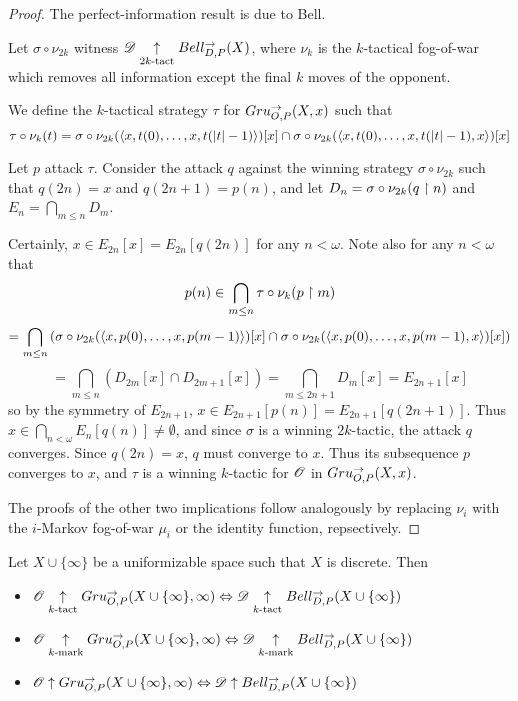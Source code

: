 \begin{proof}
The perfect-information result is due to Bell.

Let $\sigma\circ \nu_{2k}$ witness $\mathscr{D} \underset{2k\text{-tact}}{\uparrow} Bell_{D,P}^{\to}(X)$,
where $\nu_k$ is the $k$-tactical fog-of-war which removes all information
except the final $k$ moves of the opponent.

We define the $k$-tactical strategy $\tau$ for $Gru_{O,P}^{\to}(X,x)$ such that
  \[
    \tau\circ \nu_k(t)
      =
    \sigma\circ \nu_{2k}(\langle x,t(0),\dots,x,t(|t|-1)\rangle)[x]
      \cap
    \sigma\circ \nu_{2k}(\langle x,t(0),\dots,x,t(|t|-1),x\rangle)[x]
  \]

Let $p$ attack $\tau$. Consider the attack $q$ against the winning strategy
$\sigma\circ \nu_{2k}$ such that $q(2n)=x$ and $q(2n+1)=p(n)$, and let
$D_n=\sigma\circ \nu_{2k}(q\restriction n)$ and $E_n=\bigcap_{m\leq n}D_m$.

Certainly, $x\in E_{2n}[x]= E_{2n}[q(2n)]$ for any $n<\omega$.
Note also for any $n<\omega$ that
    \[
      p(n) \in
      \bigcap_{m\leq n}\tau\circ \nu_k(p\restriction m)
    \]
    \[
      =
      \bigcap_{m\leq n}\left(
        \sigma\circ \nu_{2k}(\langle x,p(0),\dots,x,p(m-1)\rangle)[x]\cap
        \sigma\circ \nu_{2k}(\langle x,p(0),\dots,x,p(m-1),x\rangle)[x]
      \right)
    \]
    \[
      =
      \bigcap_{m\leq n}\left(
        D_{2m}[x]\cap
        D_{2m+1}[x]
      \right) =
      \bigcap_{m\leq 2n+1} D_m[x]=E_{2n+1}[x]
    \]
so by the symmetry of $E_{2n+1}$, $x\in E_{2n+1}[p(n)]= E_{2n+1}[q(2n+1)]$.
Thus $x\in \bigcap_{n<\omega} E_n[q(n)]\not=\emptyset$, and since $\sigma$ is
a winning $2k$-tactic, the attack $q$ converges. Since $q(2n)=x$, $q$ must
converge to $x$. Thus its subsequence $p$ converges to $x$, and $\tau$ is a
winning $k$-tactic for $\mathscr{O}$ in $Gru_{O,P}^{\to}(X,x)$.

The proofs of the other two implications follow analogously by
replacing $\nu_i$ with the $i$-Markov fog-of-war $\mu_i$ or the identity
function, repsectively.
\end{proof}

\begin{thm}
  Let $X\cup\{\infty\}$ be a uniformizable space such that $X$ is discrete. Then
  \begin{itemize}
    \item
      $
        \mathscr{O}\underset{k\text{-tact}}{\uparrow} Gru_{O,P}^{\to}(X\cup\{\infty\},\infty)
          \Leftrightarrow
        \mathscr{D} \underset{k\text{-tact}}{\uparrow} Bell_{D,P}^{\to}(X\cup\{\infty\})
      $
    \item
      $
        \mathscr{O}\underset{k\text{-mark}}{\uparrow} Gru_{O,P}^{\to}(X\cup\{\infty\},\infty)
          \Leftrightarrow
        \mathscr{D} \underset{k\text{-mark}}{\uparrow} Bell_{D,P}^{\to}(X\cup\{\infty\})
      $
    \item
      $
        \mathscr{O}\uparrow Gru_{O,P}^{\to}(X\cup\{\infty\},\infty)
          \Leftrightarrow
        \mathscr{D} \uparrow Bell_{D,P}^{\to}(X\cup\{\infty\})
      $
  \end{itemize}
\end{thm}


